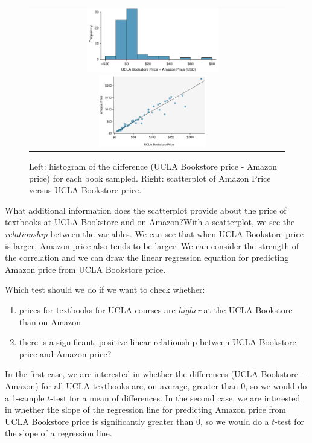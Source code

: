 \begin{figure}[h]
\centering
\begin{tabular}{cc}
\includegraphics[width=0.55\textwidth]{ch_inference_for_means/figures/textbooksF18/diffInTextbookPricesF18}
\includegraphics[width=0.45\textwidth]{ch_regr_simple_linear/figures/textbooks_scatter/textbooks_scatter}
\end{tabular}
\caption{Left: histogram of the difference (UCLA Bookstore price - Amazon price) for
    each book sampled.  Right: scatterplot of Amazon Price versus UCLA Bookstore price.}
\label{textbooksHistogramScatter}
\end{figure}


\begin{examplewrap}
\begin{nexample}
{What additional information does the scatterplot provide about the price of textbooks at UCLA Bookstore and on Amazon?}With a scatterplot, we see the \emph{relationship} between the variables.  We can see that when UCLA Bookstore price is larger, Amazon price also tends to be larger.  We can consider the strength of the correlation and we can draw the linear regression equation for predicting Amazon price from UCLA Bookstore price.  
\end{nexample}
\end{examplewrap}

\begin{examplewrap}
\begin{nexample}
{Which test should we do if we want to check whether:
\begin{enumerate}
\item prices for textbooks for UCLA courses are \emph{higher} at the UCLA Bookstore than on Amazon
\item there is a significant, positive linear relationship between UCLA Bookstore price and Amazon price?
\end{enumerate}}
In the first case, we are interested in whether the differences (UCLA Bookstore $-$ Amazon) for all UCLA textbooks are, on average, greater than 0, so we would do a 1-sample $t$-test for a mean of differences.  In the second case, we are interested in whether the slope of the regression line for predicting Amazon price from UCLA Bookstore price is significantly greater than 0, so we would do a $t$-test for the slope of a regression line.  
\end{nexample}
\end{examplewrap}

